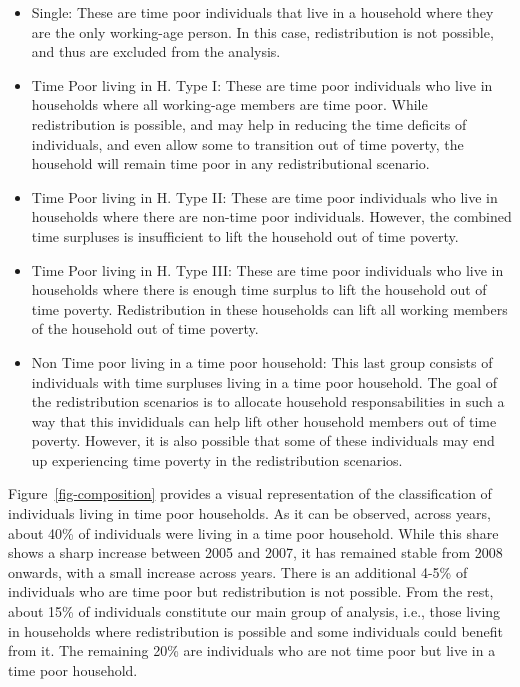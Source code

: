 \documentclass[
  11pt,
]{article}
\providecommand{\tightlist}{%
  \setlength{\itemsep}{0pt}\setlength{\parskip}{0pt}}\usepackage{longtable,booktabs,array}
\begin{document}
\begin{itemize}
\tightlist
\item
  Single: These are time poor individuals that live in a household where
  they are the only working-age person. In this case, redistribution is
  not possible, and thus are excluded from the analysis.
\item
  Time Poor living in H. Type I: These are time poor individuals who
  live in households where all working-age members are time poor. While
  redistribution is possible, and may help in reducing the time deficits
  of individuals, and even allow some to transition out of time poverty,
  the household will remain time poor in any redistributional scenario.
\item
  Time Poor living in H. Type II: These are time poor individuals who
  live in households where there are non-time poor individuals. However,
  the combined time surpluses is insufficient to lift the household out
  of time poverty.
\item
  Time Poor living in H. Type III: These are time poor individuals who
  live in households where there is enough time surplus to lift the
  household out of time poverty. Redistribution in these households can
  lift all working members of the household out of time poverty.
\item
  Non Time poor living in a time poor household: This last group
  consists of individuals with time surpluses living in a time poor
  household. The goal of the redistribution scenarios is to allocate
  household responsabilities in such a way that this invididuals can
  help lift other household members out of time poverty. However, it is
  also possible that some of these individuals may end up experiencing
  time poverty in the redistribution scenarios.
\end{itemize}

Figure~\ref{fig-composition} provides a visual representation of the
classification of individuals living in time poor households. As it can
be observed, across years, about 40\% of individuals were living in a
time poor household. While this share shows a sharp increase between
2005 and 2007, it has remained stable from 2008 onwards, with a small
increase across years. There is an additional 4-5\% of individuals who
are time poor but redistribution is not possible. From the rest, about
15\% of individuals constitute our main group of analysis, i.e., those
living in households where redistribution is possible and some
individuals could benefit from it. The remaining 20\% are individuals
who are not time poor but live in a time poor household.
\end{document}
